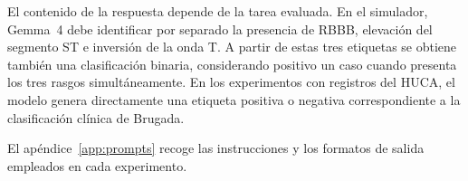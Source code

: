 El contenido de la respuesta depende de la tarea evaluada. En el simulador, Gemma~4 debe identificar por separado la presencia de RBBB, elevación del segmento ST e inversión de la onda T. A partir de estas tres etiquetas se obtiene también una clasificación binaria, considerando positivo un caso cuando presenta los tres rasgos simultáneamente. En los experimentos con registros del HUCA, el modelo genera directamente una etiqueta positiva o negativa correspondiente a la clasificación clínica de Brugada.

El apéndice~\ref{app:prompts} recoge las instrucciones y los formatos de salida empleados en cada experimento.
